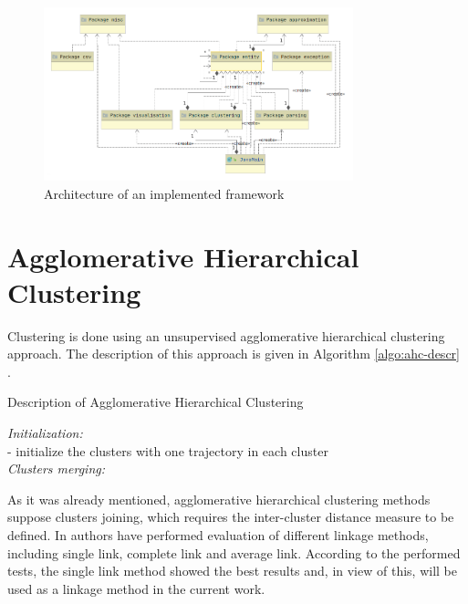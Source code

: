 \begin{figure}[!htb]
	\centering{}
	\includegraphics[width=0.8\textwidth]{images/proj-arch.png}
	\caption{Architecture of an implemented framework}
	\label{fig:proj-arch}
\end{figure}

\section{Agglomerative Hierarchical Clustering}

Clustering is done using an unsupervised agglomerative hierarchical clustering approach. The description of this approach is given in Algorithm \ref{algo:ahc-descr} \cite{inproceedings:7_related_work}.

\begin{algorithm}[!htb]
	\caption{Description of Agglomerative Hierarchical Clustering}
	\label{algo:ahc-descr}
	\SetAlgoLined
	\textit{Initialization:} \\
	- initialize the clusters with one trajectory in each cluster \\
	\textit{Clusters merging:}\\
	
\end{algorithm}

As it was already mentioned, agglomerative hierarchical clustering methods suppose clusters joining, which requires the inter-cluster distance measure to be defined. In \cite{inproceedings:7_related_work} authors have performed evaluation of different linkage methods, including single link, complete link and average link. According to the performed tests, the single link method showed the best results and, in view of this, will be used as a linkage method in the current work.

